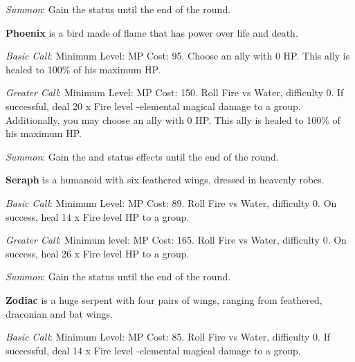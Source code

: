 \begin{multicols}{2}
    \textit{Summon}: Gain the  status until the end of the round.

    \ffcrystal[type=level,height=8pt]
    
    \textbf{Phoenix} is a bird made of flame that has power over life and death.
    
    \textit{Basic Call}: Minimum Level:  MP Cost: 95. Choose an ally with 0 HP\@. This ally is healed to 100\% of his maximum HP\@. 
    
    \textit{Greater Call}: Minimum Level:  MP Cost: 150. Roll Fire vs Water, difficulty 0. If successful, deal 20 x Fire level -elemental magical damage to a group. Additionally, you may choose an ally with 0 HP\@. This ally is healed to 100\% of his maximum HP\@. 
    
    \textit{Summon}: Gain the  and   status effects until the end of the round.

    \ffcrystal[type=level,height=8pt]
    
    \textbf{Seraph} is a humanoid with six feathered wings, dressed in heavenly robes.
    
    \textit{Basic Call}: Minimum Level:  MP Cost: 89. Roll Fire vs Water, difficulty 0. On success, heal 14 x Fire level HP to a group.
    
    \textit{Greater Call}: Minimum level:  MP Cost: 165. Roll Fire vs Water, difficulty 0. On success, heal 26 x Fire level HP to a group.
    
    \textit{Summon}: Gain the  status until the end of the round.

    \ffcrystal[type=level,height=8pt]
    
    \textbf{Zodiac} is a huge serpent with four pairs of wings, ranging from feathered, draconian and bat wings.
    
    \textit{Basic Call}: Minimum Level:  MP Cost: 85. Roll Fire vs Water, difficulty 0. If successful, deal 14 x Fire level -elemental magical damage to a group.
    

\end{multicols}
